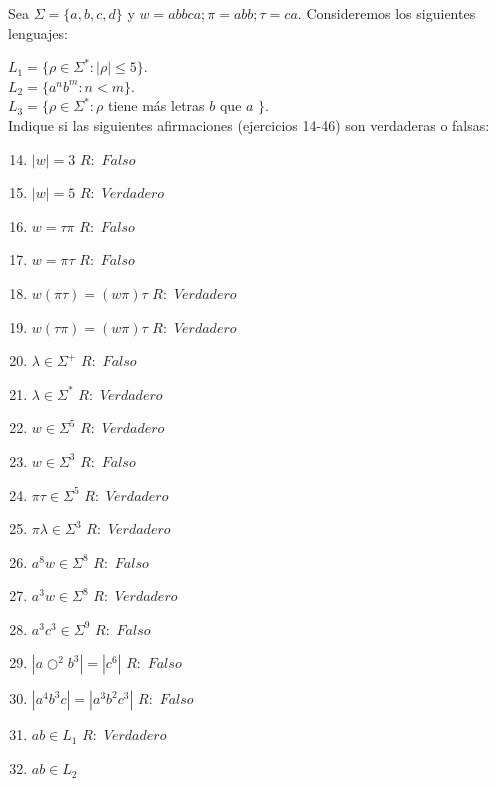 Sea $\Sigma = \{a,b,c,d\}$ y $w=abbca; \pi=abb; \tau=ca$. Consideremos los siguientes lenguajes:

$L_1 = \{\rho \in \Sigma^* : |\rho| \leq 5\}$.\\
$L_2 = \{a^n b^m : n < m\}$.\\
$L_3 = \{\rho \in \Sigma^* : \rho$ tiene más letras $b$ que $a$ $\}$.\\

Indique si las siguientes afirmaciones (ejercicios 14-46) son verdaderas o falsas:

\begin{enumerate}
    \setcounter{enumi}{13}
    \item $|w| = 3$
        \subitem $R: $ $Falso$
    \item $|w| = 5$
    \subitem $R: $ $Verdadero$
    \item $w = \tau\pi$
    \subitem $R: $ $Falso$
    \item $w = \pi\tau$
    \subitem $R: $ $Falso$
    \item $w(\pi\tau) = (w\pi)\tau$
    \subitem $R: $ $Verdadero$
    \item $w(\tau\pi) = (w\pi)\tau$
    \subitem $R: $ $Verdadero$
    \item $\lambda \in \Sigma^+$
    \subitem $R: $ $Falso$
    \item $\lambda \in \Sigma^*$
    \subitem $R: $ $Verdadero$
    \item $w \in \Sigma^5$
    \subitem $R: $ $Verdadero$
    \item $w \in \Sigma^3$
    \subitem $R: $ $Falso$
    \item $\pi\tau \in \Sigma^5$
    \subitem $R: $ $Verdadero$
    \item $\pi\lambda \in \Sigma^3$
    \subitem $R: $ $Verdadero$
    \item $a^8 w \in \Sigma^8$
    \subitem $R: $ $Falso$
    \item $a^3 w \in \Sigma^8$
    \subitem $R: $ $Verdadero$
    \item $a^3 c^3 \in \Sigma^9$
    \subitem $R: $ $Falso$
    \item $|a○^2 b^3| = |c^6|$
    \subitem $R: $ $Falso$
    \item $|a^4 b^3 c| = |a^3 b^2 c^3|$
    \subitem $R: $ $Falso$
    \item $ab \in L_1$
    \subitem $R: $ $Verdadero$
    \item $ab \in L_2$

\end{enumerate}
